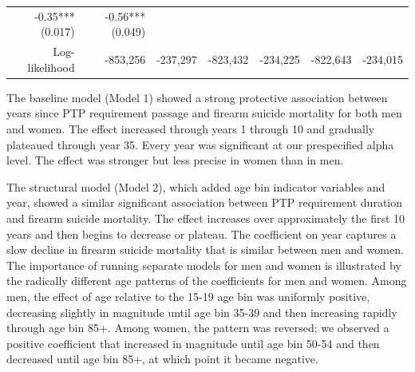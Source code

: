 \documentclass[]{article}
\begin{document}
\begin{longtable}[c]{@{}rrrrrrr@{}}
\begin{minipage}[t]{0.11\columnwidth}\raggedleft\strut
-0.35*** (0.017)
\strut\end{minipage} &
\begin{minipage}[t]{0.11\columnwidth}\raggedleft\strut
-0.56*** (0.049)
\strut\end{minipage}\tabularnewline
\begin{minipage}[t]{0.12\columnwidth}\raggedleft\strut
Log-likelihood
\strut\end{minipage} &
\begin{minipage}[t]{0.11\columnwidth}\raggedleft\strut
-853,256
\strut\end{minipage} &
\begin{minipage}[t]{0.12\columnwidth}\raggedleft\strut
-237,297
\strut\end{minipage} &
\begin{minipage}[t]{0.11\columnwidth}\raggedleft\strut
-823,432
\strut\end{minipage} &
\begin{minipage}[t]{0.12\columnwidth}\raggedleft\strut
-234,225
\strut\end{minipage} &
\begin{minipage}[t]{0.11\columnwidth}\raggedleft\strut
-822,643
\strut\end{minipage} &
\begin{minipage}[t]{0.11\columnwidth}\raggedleft\strut
-234,015
\strut\end{minipage}\tabularnewline
\bottomrule
\end{longtable}

The baseline model (Model 1) showed a strong protective association
between years since PTP requirement passage and firearm suicide
mortality for both men and women. The effect increased through years 1
through 10 and gradually plateaued through year 35. Every year was
significant at our prespecified alpha level. The effect was stronger but
less precise in women than in men.

The structural model (Model 2), which added age bin indicator variables
and year, showed a similar significant association between PTP
requirement duration and firearm suicide mortality. The effect increases
over approximately the first 10 years and then begins to decrease or
plateau. The coefficient on year captures a slow decline in firearm
suicide mortality that is similar between men and women. The importance
of running separate models for men and women is illustrated by the
radically different age patterns of the coefficients for men and women.
Among men, the effect of age relative to the 15-19 age bin was uniformly
positive, decreasing slightly in magnitude until age bin 35-39 and then
increasing rapidly through age bin 85+. Among women, the pattern was
reversed; we observed a positive coefficient that increased in magnitude
until age bin 50-54 and then decreased until age bin 85+, at which point
it became negative.
\end{document}
